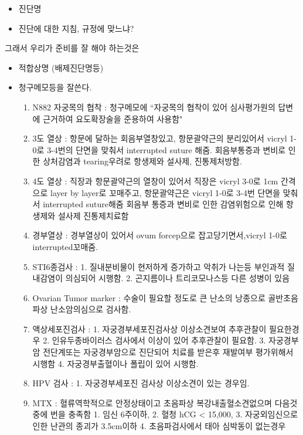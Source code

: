 \begin{itemize}
\item 진단명
\item 진단에 대한 지침, 규정에 맞느냐? 
\end{itemize}
그래서 우리가 준비를 잘 해야 하는것은

\begin{itemize}
\item 적합상명 (배제진단명등)
\item 청구메모등을 잘쓴다.
	\begin{enumerate}\tightlist
	\item N882  자궁목의 협착 : 청구메모에 ``자궁목의 협착이 있어 심사평가원의 답변에 근거하여 요도확장술을 준용하여 사용함"
	\item 3도 열상 : 항문에 달하는 회음부열창있고, 항문괄약근의 분리있어서 vicryl 1-0로 3-4번의 단면을 맞춰서 interrupted suture  해줌.
회음부통증과 변비로 인한 상처감염과 tearing우려로 항생제와 설사제, 진통제처방함.
	\item 4도 열상 : 직장과 항문괄약근의 열창이 있어서 직장은 vicryl 3-0로 1cm 간격으로 layer by layer로 꼬매주고, 항문괄약근은 vicryl 1-0로 3-4번 단면을 맞춰서 interrupted suture해줌
회음부 통증과 변비로 인한 감염위험으로 인해 항생제와 설사제 진통제치료함
	\item 경부열상 : 경부열상이 있어서 ovum forcep으로 잡고당기면서,vicryl 1-0로  interrupted꼬매줌.
	\item STI6종검사 : 1. 질내분비물이 현저하게 증가하고 악취가 나는등 부인과적 질내감염이 의심되어 시행함.
2. 곤지름이나 트리코모나스등 다른 성병이 있음
	\item Ovarian Tumor marker : 수술이 필요할 정도로 큰 난소의 낭종으로 골반초음파상 난소암의심으로 검사함.
	\item 액상세포진검사 : 1. 자궁경부세포진검사상 이상소견보여 추후관찰이 필요한경우
2. 인유두종바이러스 검사에서 이상이 있어 추후관찰이 필요함.
3. 자궁경부암 전단계또는 자궁경부암으로 진단되어 치료를 받은후 재발여부 평가위해서 시행함
4. 자궁경부출혈이나 폴립이 있어 시행함.
	\item HPV 검사 : 1.  자궁경부세포진 검사상 이상소견이 있는 경우임.
	\item MTX : 혈류역학적으로 안정상태이고 초음파상 복강내출혈소견없으며 다음것중에 번을 충족함
1. 임신 6주이하, 2. 혈청  hCG < 15,000, 3. 자궁외임신으로인한 난관의 종괴가 3.5cm이하 4. 초음파검사에서 태아 심박동이 없는경우
	\end{enumerate}
\end{itemize}

